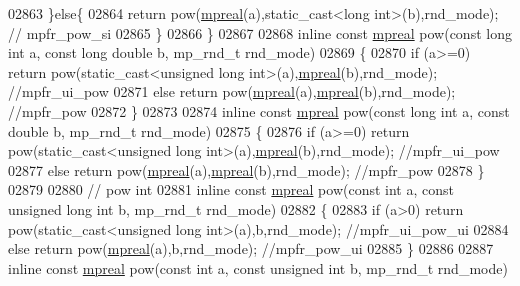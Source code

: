 \begin{DoxyCode}
{{02863     \}\textcolor{keywordflow}{else}\{
02864         \textcolor{keywordflow}{return} pow(\hyperlink{classmpfr_1_1mpreal}{mpreal}(a),static\_cast<long int>(b),rnd\_mode); \textcolor{comment}{// mpfr\_pow\_si}
02865     \}
02866 \}
02867 
02868 \textcolor{keyword}{inline} \textcolor{keyword}{const} \hyperlink{classmpfr_1_1mpreal}{mpreal} pow(\textcolor{keyword}{const} \textcolor{keywordtype}{long} \textcolor{keywordtype}{int} a, \textcolor{keyword}{const} \textcolor{keywordtype}{long} \textcolor{keywordtype}{double} b, mp\_rnd\_t rnd\_mode)
02869 \{
02870     \textcolor{keywordflow}{if} (a>=0)   \textcolor{keywordflow}{return} pow(static\_cast<unsigned long int>(a),\hyperlink{classmpfr_1_1mpreal}{mpreal}(b),rnd\_mode); \textcolor{comment}{//mpfr\_ui\_pow}
02871     \textcolor{keywordflow}{else}        \textcolor{keywordflow}{return} pow(\hyperlink{classmpfr_1_1mpreal}{mpreal}(a),\hyperlink{classmpfr_1_1mpreal}{mpreal}(b),rnd\_mode); \textcolor{comment}{//mpfr\_pow}
02872 \}
02873 
02874 \textcolor{keyword}{inline} \textcolor{keyword}{const} \hyperlink{classmpfr_1_1mpreal}{mpreal} pow(\textcolor{keyword}{const} \textcolor{keywordtype}{long} \textcolor{keywordtype}{int} a, \textcolor{keyword}{const} \textcolor{keywordtype}{double} b, mp\_rnd\_t rnd\_mode)
02875 \{
02876     \textcolor{keywordflow}{if} (a>=0)   \textcolor{keywordflow}{return} pow(static\_cast<unsigned long int>(a),\hyperlink{classmpfr_1_1mpreal}{mpreal}(b),rnd\_mode); \textcolor{comment}{//mpfr\_ui\_pow}
02877     \textcolor{keywordflow}{else}        \textcolor{keywordflow}{return} pow(\hyperlink{classmpfr_1_1mpreal}{mpreal}(a),\hyperlink{classmpfr_1_1mpreal}{mpreal}(b),rnd\_mode); \textcolor{comment}{//mpfr\_pow}
02878 \}
02879 
02880 \textcolor{comment}{// pow int}
02881 \textcolor{keyword}{inline} \textcolor{keyword}{const} \hyperlink{classmpfr_1_1mpreal}{mpreal} pow(\textcolor{keyword}{const} \textcolor{keywordtype}{int} a, \textcolor{keyword}{const} \textcolor{keywordtype}{unsigned} \textcolor{keywordtype}{long} \textcolor{keywordtype}{int} b, mp\_rnd\_t rnd\_mode)
02882 \{
02883     \textcolor{keywordflow}{if} (a>0) \textcolor{keywordflow}{return} pow(static\_cast<unsigned long int>(a),b,rnd\_mode); \textcolor{comment}{//mpfr\_ui\_pow\_ui}
02884     \textcolor{keywordflow}{else}     \textcolor{keywordflow}{return} pow(\hyperlink{classmpfr_1_1mpreal}{mpreal}(a),b,rnd\_mode); \textcolor{comment}{//mpfr\_pow\_ui}
02885 \}
02886 
02887 \textcolor{keyword}{inline} \textcolor{keyword}{const} \hyperlink{classmpfr_1_1mpreal}{mpreal} pow(\textcolor{keyword}{const} \textcolor{keywordtype}{int} a, \textcolor{keyword}{const} \textcolor{keywordtype}{unsigned} \textcolor{keywordtype}{int} b, mp\_rnd\_t rnd\_mode)
}}
\end{DoxyCode}
